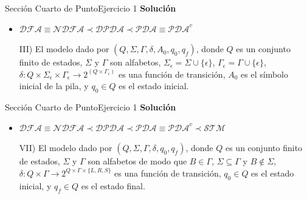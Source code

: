 \documentclass[10pt, envcountsect, presentation, aspectratio=169]{beamer}
\begin{document}

\begin{frame}{Sección Cuarto de Punto}{Ejercicio 1}
    \textbf{Solución}\\
    \begin{itemize}
        \item $\mathcal{DFA} \equiv \mathcal{NDFA} \prec \mathcal{DPDA} \prec \mathcal{PDA} \equiv \mathcal{PDA}^v$
        \item[III)] El modelo dado por $(Q,\Sigma,\Gamma,\delta,A_0,q_0,q_f)$, donde  $Q$ es un conjunto finito de estados, $\Sigma$ y $\Gamma$ son alfabetos, $\Sigma_\epsilon=\Sigma \cup \{\epsilon\}$, $\Gamma_\epsilon=\Gamma \cup \{\epsilon\}$, $\delta:Q\times \Sigma_\epsilon\times\Gamma_\epsilon\rightarrow 2^{(Q\times\Gamma_\epsilon)}$ es  una  función de transición, $A_0$ es el símbolo inicial de la pila, y $q_0\in Q$ es el estado inicial.         
    \end{itemize}
\end{frame}


\begin{frame}{Sección Cuarto de Punto}{Ejercicio 1}
    \textbf{Solución}\\
    \begin{itemize}
        \item $\mathcal{DFA} \equiv \mathcal{NDFA} \prec \mathcal{DPDA} \prec \mathcal{PDA} \equiv \mathcal{PDA}^v \prec \mathcal{STM}$
        \item[VII)] El modelo dado por $(Q,\Sigma,\Gamma,\delta,q_0,q_f)$, donde $Q$ es un conjunto finito de estados, $\Sigma$ y $\Gamma$ son alfabetos de modo que $B\in\Gamma$,  $\Sigma\subseteq\Gamma$ y $B \notin \Sigma$, $\delta:Q\times\Gamma\rightarrow 2^{Q\times\Gamma\times\{L,R, S\}}$ es  una función de transición, $q_0\in Q$ es el estado inicial, y $q_f\in Q$ es el estado final.     
    \end{itemize}
\end{frame}

\end{document}
